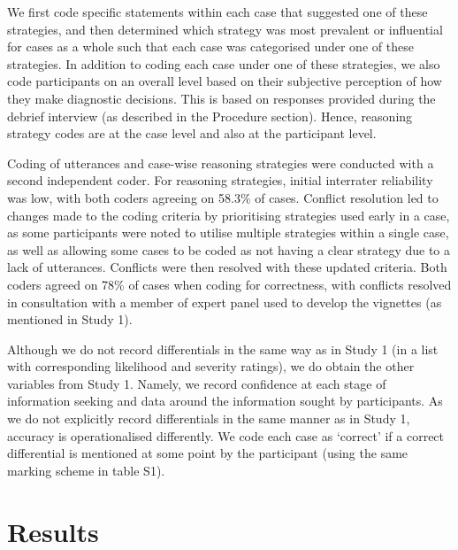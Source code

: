 \documentclass[a4paper, nobind]{templates/ociamthesis}
\begin{document}
We first code specific statements within each case that suggested one of these strategies, and then determined which strategy was most prevalent or influential for cases as a whole such that each case was categorised under one of these strategies. In addition to coding each case under one of these strategies, we also code participants on an overall level based on their subjective perception of how they make diagnostic decisions. This is based on responses provided during the debrief interview (as described in the Procedure section). Hence, reasoning strategy codes are at the case level and also at the participant level.

Coding of utterances and case-wise reasoning strategies were conducted with a second independent coder. For reasoning strategies, initial interrater reliability was low, with both coders agreeing on 58.3\% of cases. Conflict resolution led to changes made to the coding criteria by prioritising strategies used early in a case, as some participants were noted to utilise multiple strategies within a single case, as well as allowing some cases to be coded as not having a clear strategy due to a lack of utterances. Conflicts were then resolved with these updated criteria. Both coders agreed on 78\% of cases when coding for correctness, with conflicts resolved in consultation with a member of expert panel used to develop the vignettes (as mentioned in Study 1).

Although we do not record differentials in the same way as in Study 1 (in a list with corresponding likelihood and severity ratings), we do obtain the other variables from Study 1. Namely, we record confidence at each stage of information seeking and data around the information sought by participants. As we do not explicitly record differentials in the same manner as in Study 1, accuracy is operationalised differently. We code each case as `correct' if a correct differential is mentioned at some point by the participant (using the same marking scheme in table S1).

\section*{Results}\label{results-1}
\end{document}
